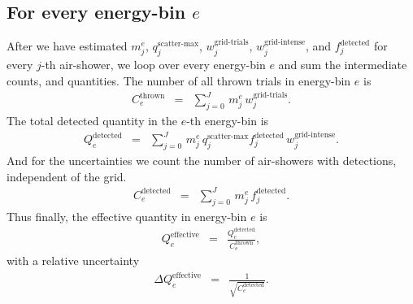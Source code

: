 \documentclass[a4paper,12pt,oneside]{article}
\def\WeightGridTrials{w^\text{grid-trials}}
\def\WeightGridSuccesses{w^\text{grid-intense}}
\begin{document}
\subsection*{For every energy-bin $e$}
%
After we have estimated $m^e_j$, $q^\text{scatter-max}_j$, $\WeightGridTrials_j$, $\WeightGridSuccesses_j$, and $f^\text{detected}_j$ for every $j$-th air-shower, we loop over every energy-bin $e$ and sum the intermediate counts, and quantities.
%
The number of all thrown trials in energy-bin $e$ is
%
\begin{eqnarray}
C^\text{thrown}_e &=& \sum_{j=0}^J\,m^e_j\,\WeightGridTrials_j.
\end{eqnarray}
%
The total detected quantity in the $e$-th energy-bin is
%
\begin{eqnarray}
Q^\text{detected}_e &=& \sum_{j=0}^J\,m^e_j\, q^\text{scatter-max}_j  f^\text{detected}_j\,\WeightGridSuccesses_j.
\end{eqnarray}
%
And for the uncertainties we count the number of air-showers with detections, independent of the grid.
%
\begin{eqnarray}
C^\text{detected}_e &=& \sum_{j=0}^J\,m^e_j\,f^\text{detected}_j.
\end{eqnarray}
%
Thus finally, the effective quantity in energy-bin $e$ is
%
\begin{eqnarray}
Q^\text{effective}_e &=& \frac{Q^\text{detected}_e}{C^\text{thrown}_e},
\end{eqnarray}
%
with a relative uncertainty
%
\begin{eqnarray}
\Delta Q^\text{effective}_e &=& \frac{1}{\sqrt{C^\text{detected}_e}}.
\end{eqnarray}
%
\def\EnergyBinEdges{E^\text{min}_e}
\def\HistNumThrown{N}
\def\HistNumDetected{ND}
\def\HistNumDetectedNoWeigths{NDW}
\def\QThrown{QT}
\def\QDetected{Q^\text{detected}_e}
\def\Qeff{Q^\text{effective}_e}
\def\QeffRel{\Delta Q^\text{effective}_e}
\def\QeffAbs{QeffAbs}
\def\HistDetectionMask{C^\text{detected}_e}
\def\HistDetectionWeights{\sum_j^J\,m^e_j\,\WeightGridSuccesses_j}
\def\HistThorwnWeights{C^\text{thrown}_e}
\def\HistThorwnMask{\sum_j^J\,m^e_j}
\def\HistEnergies{HE}
%
\end{document}
